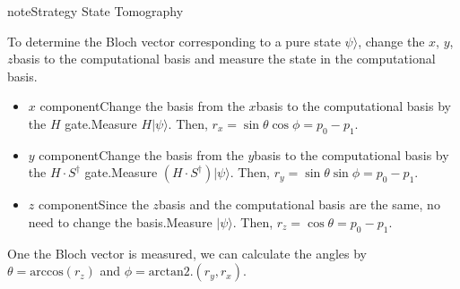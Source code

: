 \documentclass[letterpaper,10pt,english]{jupyterBook}
\begin{document}
\begin{sphinxadmonition}{note}{Strategy \sphinxhyphen{} State Tomography}

\sphinxAtStartPar
To determine the Bloch vector corresponding to a pure state \(\psi\rangle\),  change the \(x\)\sphinxhyphen{}, \(y\)\sphinxhyphen{}, \(z\)\sphinxhyphen{}basis to the computational basis and measure the state in the computational basis.
\begin{itemize}
\item {}
\sphinxAtStartPar
\(x\) componentChange the basis from the \(x\)\sphinxhyphen{}basis to the computational basis  by the \(H\) gate.Measure \(H |\psi\rangle\).  Then, \(r_x = \sin\theta \cos \phi = p_0 -p_1\).

\item {}
\sphinxAtStartPar
\(y\) componentChange the basis from the \(y\)\sphinxhyphen{}basis to the computational basis  by the \(H\cdot S^\dagger\) gate.Measure \((H\cdot S^\dagger) |\psi\rangle\).  Then, \(r_y = \sin\theta \sin\phi = p_0 -p_1\).

\item {}
\sphinxAtStartPar
\(z\) componentSince the \(z\)\sphinxhyphen{}basis and the computational basis are the same, no need to change the basis.Measure \(|\psi\rangle\).  Then, \(r_z = \cos\theta = p_0 -p_1\).

\end{itemize}

\sphinxAtStartPar
One the Bloch vector is measured, we can calculate the angles by \(\theta = \text{arccos}(r_z)\) and \(\phi = \text{arctan2}.(r_y,r_x)\).
\end{sphinxadmonition}
\end{document}
